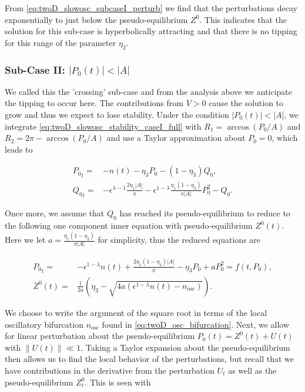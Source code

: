 From \eqref{eq:twoD_slowosc_subcaseI_perturb} we find that the perturbations decay exponentially to just below the pseudo-equilibrium $Z^0$. This indicates that the solution for this sub-case is hyperbolically attracting and that there is no tipping for this range of the parameter $\eta_2$.

\subsubsection{Sub-Case II: $|P_0(t)|<|A|$}

We called this the 'crossing' sub-case and from the analysis above we anticipate the tipping to occur here. The contributions from $V>0$ cause the solution to grow and thus we expect to lose stability. Under the condition $|P_0(t)|<|A|$, we integrate \eqref{eq:twoD_slowosc_stability_caseI_full} with $R_1=\arccos(P_0/A)$ and $R_2=2\pi-\arccos(P_0/A)$ and use a Taylor approximation about $P_0=0$, which leads to 

\begin{equation}\label{eq:twoD_slowosc_stability_subcaseII,full}
\begin{aligned}
{P_0}_t =& -n(t)-\eta_3 P_0-(1-\eta_3)Q_0,\\
{Q_0}_t =&-\epsilon^{\lambda-1}\frac{2\eta_1|A|}{\pi}-\epsilon^{1-\lambda}\frac{\eta_1(1-\eta_3)}{\pi|A|}P_0^2-Q_0.
\end{aligned}
\end{equation}

\indent Once more, we assume that $Q_0$ has reached its pseudo-equilibrium 
to reduce to the following one component inner equation with pseudo-equilibrium $Z^0(t)$. Here we let $a=\frac{\eta_1(1-\eta_3)}{\pi|A|}$ for simplicity, thus the reduced equations are

\begin{equation}\label{eq:twoD_slowosc_stability_subcaseII,reduced}
\begin{aligned}
{P_0}_t =& -\epsilon^{1-\lambda}n(t)+\frac{2\eta_1(1-\eta_3)|A|}{\pi}-\eta_3 P_0+aP_0^2=f(t,P_0),\\
Z^0(t) =& \frac{1}{2a}\left(\eta_3-\sqrt{4a(\epsilon^{1-\lambda}n(t)-n_{\text{osc}})}\right).
\end{aligned}
\end{equation}

We choose to write the argument of the square root in terms of the local oscillatory bifurcation ${n}_{\text{osc}}$ found in \eqref{eq:twoD_osc_bifurcation}. Next, we allow for linear perturbation about the pseudo-equilibrium $P_0(t)= Z^0(t)+U(t)$ with $\lVert U(t)\rVert \ll 1$. Taking a Taylor expansion about the pseudo-equilibrium then allows us to find the local behavior of the perturbations, but recall that we have contributions in the derivative from the perturbation $U_t$ as well as the pseudo-equilibrium $Z^0_t$. This is seen with


